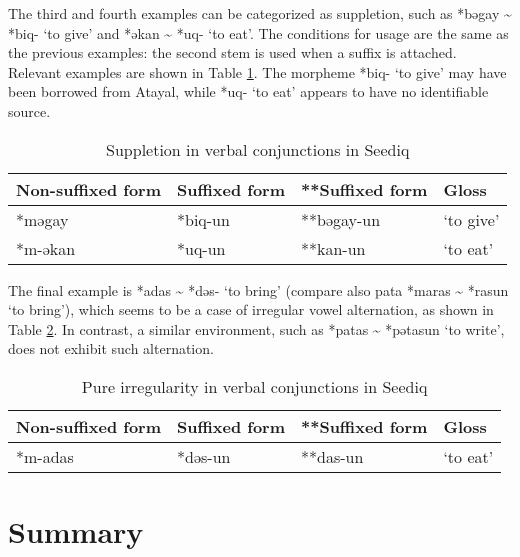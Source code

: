 The third and fourth examples can be categorized as suppletion, such as *bəgay \~{} *biq- `to give' and *əkan \~{} *uq- `to eat'. The conditions for usage are the same as the previous examples: the second stem is used when a suffix is attached. Relevant examples are shown in Table \ref{tab:psed_supp}. The morpheme *biq- `to give' may have been borrowed from Atayal, while *uq- `to eat' appears to have no identifiable source.

\begin{table}[!htbp]
\centering
\caption{Suppletion in verbal conjunctions in Seediq}
\label{tab:psed_supp}
\begin{tabular}{llll}
\hline
Non-suffixed form & Suffixed form & **Suffixed form & Gloss     \\ \hline
*məgay            & *biq-un       & **bəgay-un      & `to give' \\
*m-əkan           & *uq-un        & **kan-un        & `to eat'  \\ \hline
\end{tabular}
\end{table}

The final example is *adas \~{} *dəs- `to bring' (compare also \acl{pata} *maras \~{} *rasun `to bring'), which seems to be a case of irregular vowel alternation, as shown in Table \ref{tab:psed_v_irr}. In contrast, a similar environment, such as *patas \~{} *pətasun `to write', does not exhibit such alternation.

\begin{table}[!htbp]
\centering
\caption{Pure irregularity in verbal conjunctions in Seediq}
\label{tab:psed_v_irr}
\begin{tabular}{llll}
\hline
Non-suffixed form & Suffixed form & **Suffixed form & Gloss     \\ \hline
*m-adas           & *dəs-un       & **das-un        & `to eat'  \\ \hline
\end{tabular}
\end{table}

\section{Summary}



